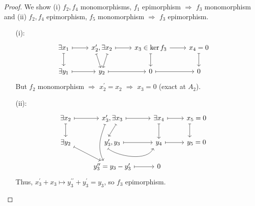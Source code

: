 \documentclass[a4paper,11pt]{article}
\begin{document}
				\begin{proof}
					We show (i) $f_2,f_4$ monomorphisms, $f_1$ epimorphism $\Longrightarrow$ $f_3$ monomorphism and (ii) $f_2,f_4$ epimorphism, $f_5$ monomorphism $\Longrightarrow$ $f_3$ epimorphism.
					\begin{enumerate}
						\item[(i):] \begin{equation*}
							\begin{tikzcd}
								\exists x_1\ar[d,mapsto]\ar[r,mapsto]& x_2^{\prime},\exists x_2\ar[d,mapsto,xshift=-2.5ex,end anchor=north east]\ar[d,mapsto,xshift=2.5ex,end anchor=north west]\ar[r,mapsto]& x_3\in\ker f_3\ar[d,mapsto]\ar[r]& x_4=0\ar[d,mapsto]\\
								\exists y_1\ar[r,mapsto]& y_2\ar[r,mapsto]& 0\ar[r,mapsto]& 0
							\end{tikzcd}
						\end{equation*}
						But $f_2$ monomorphism $\Rightarrow$ $x_2^{\prime}=x_2$ $\Rightarrow$ $x_3=0$ (exact at $A_2$).
						\item[(ii):] \begin{equation*}
							\begin{tikzcd}
								\exists x_2\ar[d,mapsto]\ar[r,mapsto]& x_3^{\prime},\exists x_3\ar[dd,mapsto,xshift=-2ex,controls={+(-.1,-0.4) and +(-.4,0.8)}]\ar[d,mapsto,xshift=2.5ex,end anchor=north west]\ar[r,mapsto]& \exists x_4\ar[d,mapsto]\ar[r,mapsto]& x_5=0\ar[d,mapsto,xshift=-2.3ex]\\
								\exists y_2\ar[rd,mapsto] & y_3^{\prime},y_3\ar[r,mapsto,xshift=-4ex,controls={+(.5,-.4) and +(-.3,-.7)},end anchor=south east]\ar[r,mapsto]& y_4\ar[r,mapsto]& y_5=0\\
								& y_3^{\prime\prime}=y_3-y_3^{\prime}\ar[r,mapsto]& 0 &
							\end{tikzcd}
						\end{equation*}
						Thus, $x_3^{\prime}+x_3\mapsto y_3^{\prime\prime}+y_3^{\prime}=y_3$, so $f_3$ epimorphism.
					\end{enumerate}
				\end{proof}
\end{document}
